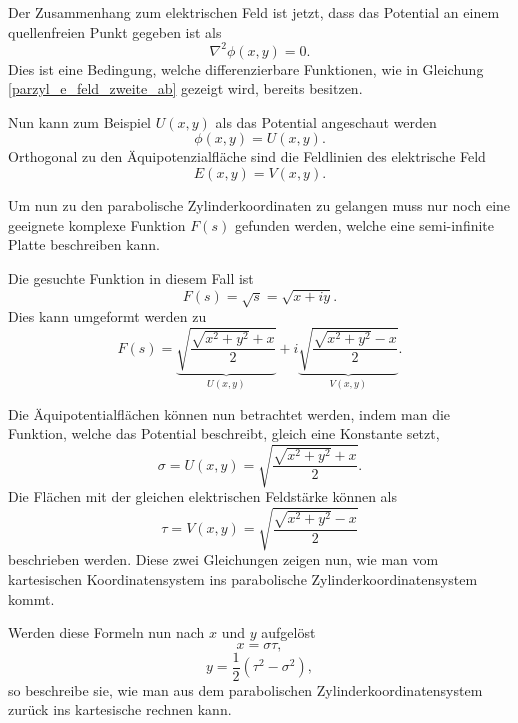  
Der Zusammenhang zum elektrischen Feld ist jetzt, dass das Potential an einem quellenfreien Punkt gegeben ist als 
\begin{equation}
	\nabla^2\phi(x,y) = 0.
\end{equation}
Dies ist eine Bedingung, welche differenzierbare Funktionen, wie in Gleichung \eqref{parzyl_e_feld_zweite_ab} gezeigt wird, bereits besitzen. 


Nun kann zum Beispiel $U(x,y)$ als das Potential angeschaut werden
\begin{equation}
	\phi(x,y) = U(x,y).
\end{equation}
Orthogonal zu den Äquipotenzialfläche sind die Feldlinien des elektrische Feld
\begin{equation}
	E(x,y) = V(x,y).
\end{equation}


Um nun zu den parabolische Zylinderkoordinaten zu gelangen muss nur noch eine geeignete 
komplexe Funktion $F(s)$ gefunden werden, 
welche eine semi-infinite Platte beschreiben kann.


Die gesuchte Funktion in diesem Fall ist
\begin{equation}
	F(s) 
	= 
	\sqrt{s} 
	= 
	\sqrt{x + iy}.
\end{equation}
Dies kann umgeformt werden zu
\begin{equation}
	F(s) 
	= 
	\underbrace{\sqrt{\frac{\sqrt{x^2+y^2} + x}{2}}}_{U(x,y)} 
	+ 
	i\underbrace{\sqrt{\frac{\sqrt{x^2+y^2} - x}{2}}}_{V(x,y)}
	.
\end{equation}


Die Äquipotentialflächen können nun betrachtet werden, 
indem man die Funktion, welche das Potential beschreibt, gleich eine Konstante setzt,
\begin{equation}
	\sigma = U(x,y) = \sqrt{\frac{\sqrt{x^2+y^2} + x}{2}}.
\end{equation}
Die Flächen mit der gleichen elektrischen Feldstärke können als
\begin{equation}
	\tau = V(x,y) = \sqrt{\frac{\sqrt{x^2+y^2} - x}{2}}
\end{equation}
beschrieben werden. Diese zwei Gleichungen zeigen nun, wie man vom 
kartesischen Koordinatensystem ins parabolische Zylinderkoordinatensystem kommt.

 
Werden diese Formeln nun nach $x$ und $y$ aufgelöst 
\begin{equation}
	x = \sigma \tau,
\end{equation}
\begin{equation}
	y = \frac{1}{2}\left ( \tau^2 - \sigma^2 \right ),
\end{equation}
so beschreibe sie, wie man aus dem parabolischen Zylinderkoordinatensystem zurück ins kartesische rechnen kann.